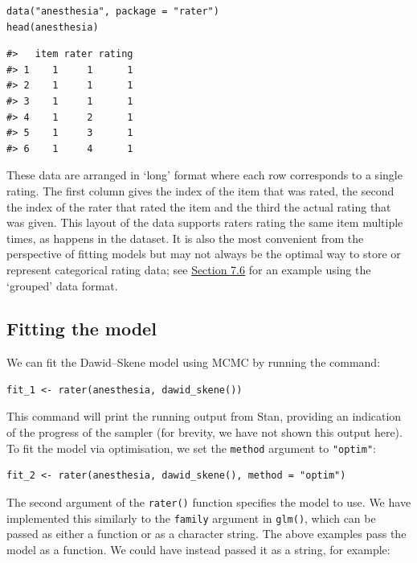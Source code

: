 \begin{verbatim}
data("anesthesia", package = "rater")
head(anesthesia)
\end{verbatim}

\begin{verbatim}
#>   item rater rating
#> 1    1     1      1
#> 2    1     1      1
#> 3    1     1      1
#> 4    1     2      1
#> 5    1     3      1
#> 6    1     4      1
\end{verbatim}

These data are arranged in `long' format where each row corresponds to a single
rating. The first column gives the index of the item that was rated, the second
the index of the rater that rated the item and the third the actual rating that
was given. This layout of the data supports raters rating the same item
multiple times, as happens in the dataset. It is also the most convenient from
the perspective of fitting models but may not always be the optimal way to
store or represent categorical rating data; see
\protect\hyperlink{sec:using-grouped-data}{Section 7.6} for an example using the `grouped' data
format.

\hypertarget{fitting-the-model}{%
\subsection{Fitting the model}\label{fitting-the-model}}

We can fit the Dawid--Skene model using MCMC by running the command:

\begin{verbatim}
fit_1 <- rater(anesthesia, dawid_skene())
\end{verbatim}

This command will print the running output from Stan, providing an
indication of the progress of the sampler (for brevity, we have not shown this
output here).
To fit the model via optimisation, we set the \texttt{method} argument to
\texttt{"optim"}:

\begin{verbatim}
fit_2 <- rater(anesthesia, dawid_skene(), method = "optim")
\end{verbatim}

The second argument of the \texttt{rater()} function specifies the model to use.
We have implemented this similarly to the \texttt{family} argument in
\texttt{glm()}, which can be passed as either a function or as a character
string. The above examples pass the model as a function. We could have instead
passed it as a string, for example:

